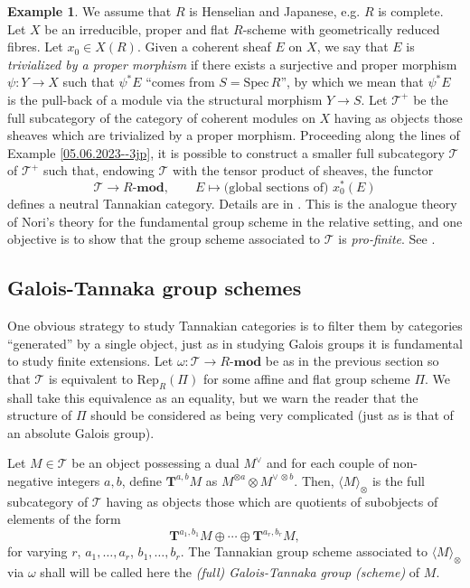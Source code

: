 \documentclass[10pt]{alggeom}
\theoremstyle{definition}
\newtheorem{ex}[thm]{Example}
\numberwithin{equation}{section}
\begin{document}
\begin{ex}We assume that $R$ is Henselian and Japanese, e.g.  $R$ is     complete.  Let $X$ be an irreducible, proper and flat $R$-scheme with geometrically reduced fibres. Let $x_0\in X(R)$. 
Given a coherent sheaf $E$ on $X$, we say that $E$ is {\it trivialized by a proper morphism} if there exists a surjective and proper morphism $\psi:Y\to X$ such that $\psi^*E$ ``comes from $S=\mathrm{Spec}\,R$'', by which we mean that $\psi^*E$ is the pull-back of a module via the structural morphism $Y\to S$. Let $\mathcal T^+$ be the full subcategory of the category of coherent modules on $X$ having as objects those sheaves which are trivialized by a proper morphism. Proceeding along the lines of Example \ref{05.06.2023--3jp}, it is possible to construct a smaller full subcategory $\mathcal T$ of $\mathcal T^+$  such that, endowing $\mathcal T$ with the tensor product of sheaves, the functor 
\[
\mathcal T\longrightarrow R\text{-}\mathbf{mod},\qquad E\longmapsto \text{(global sections of) $x_0^*(E)$}
\]
defines a neutral Tannakian category. Details are in \cite{hai-dos_santos23}. This is the analogue theory of Nori's theory for the fundamental group scheme \cite{nori76} in the relative setting, and one objective is to show that the group scheme associated to $\mathcal T$ is {\it pro-finite}. See \cite[Theorem 8.8]{hai-dos_santos23}.   
\end{ex}
 
\subsection{Galois-Tannaka group  schemes}\label{Tannak2}
One obvious strategy to study Tannakian categories is to filter them by categories ``generated'' by a single object, just as in studying Galois groups it is fundamental to study finite extensions. Let $\omega:\mathcal T\to R\text{-}\mathbf{mod}$ be    as in the previous section so that $\mathcal T$ is equivalent to $\mathrm{Rep}_R(\Pi)$ for some affine and flat group scheme $\Pi$. We shall take this equivalence as an equality, but we warn the reader that the structure of $\Pi$ should be considered as being very complicated (just as is that of an absolute Galois group). 

Let $M\in\mathcal T$ be an object possessing a dual $M^\vee$ and for each couple of non-negative integers $a,b$,  define $\mathbf T^{a,b} M$ as $M^{\otimes a}\otimes M^{\vee\,\otimes b}$. 
Then,   $\langle M\rangle_\otimes$ is  the full subcategory of $\mathcal T$ having as objects those which are quotients of subobjects of elements of the form 
\[
\mathbf T^{a_1,b_1}M\oplus\cdots\oplus \mathbf T^{a_r,b_r}M, 
\]
for varying $r$, $a_1,\ldots,a_r$, $b_1,\ldots,b_r$.  
The Tannakian group scheme associated to $\langle M\rangle_\otimes$ via $\omega$ shall   will be called here the {\it (full) Galois-Tannaka group (scheme)} of $M$. 
\xdefi
\end{document}
